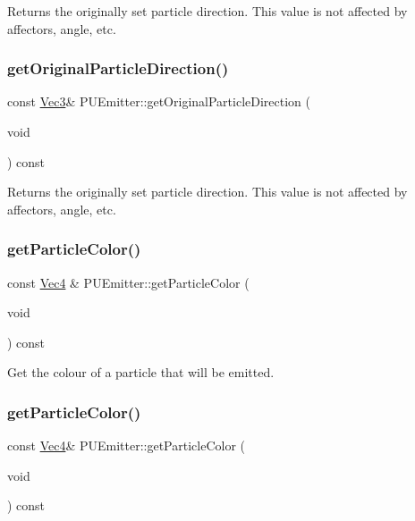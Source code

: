 Returns the originally set particle direction. This value is not affected by affectors, angle, etc. \mbox{\label{classPUEmitter_a6170df988376870b0963858332c3c2c7}} 
\subsubsection{\texorpdfstring{get\+Original\+Particle\+Direction()}{getOriginalParticleDirection()}\hspace{0.1cm}{\footnotesize\ttfamily [2/2]}}
{\footnotesize\ttfamily const \hyperlink{classVec3}{Vec3}\& P\+U\+Emitter\+::get\+Original\+Particle\+Direction (\begin{DoxyParamCaption}\item[{void}]{ }\end{DoxyParamCaption}) const}

Returns the originally set particle direction. This value is not affected by affectors, angle, etc. \mbox{\label{classPUEmitter_a4e266dca3690b7b32afb7a6fcf7eb7ed}} 
\subsubsection{\texorpdfstring{get\+Particle\+Color()}{getParticleColor()}\hspace{0.1cm}{\footnotesize\ttfamily [1/2]}}
{\footnotesize\ttfamily const \hyperlink{classVec4}{Vec4} \& P\+U\+Emitter\+::get\+Particle\+Color (\begin{DoxyParamCaption}\item[{void}]{ }\end{DoxyParamCaption}) const}

Get the colour of a particle that will be emitted. \mbox{\label{classPUEmitter_a8d13312f14f4205e4b27666e6a18338c}} 
\subsubsection{\texorpdfstring{get\+Particle\+Color()}{getParticleColor()}\hspace{0.1cm}{\footnotesize\ttfamily [2/2]}}
{\footnotesize\ttfamily const \hyperlink{classVec4}{Vec4}\& P\+U\+Emitter\+::get\+Particle\+Color (\begin{DoxyParamCaption}\item[{void}]{ }\end{DoxyParamCaption}) const}

